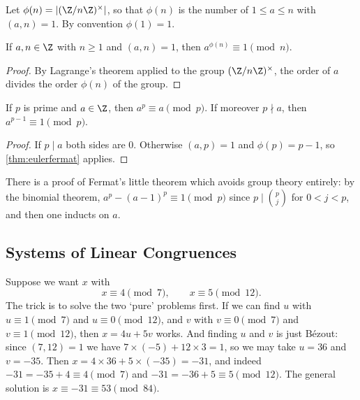 \begin{definition}
	Let $\phi(n) = |(\Z/n\Z)^\times|$, so that $\phi(n)$ is the number of $1 \leq a \leq n$ with $(a, n) = 1$. By convention $\phi(1) = 1$.
\end{definition}

\begin{theorem}\label{thm:eulerfermat}
	If $a, n \in \Z$ with $n \geq 1$ and $(a, n) = 1$, then $a^{\phi(n)} \equiv 1 \pmod n$.
\end{theorem}
\begin{proof}
	By Lagrange's theorem applied to the group $(\Z/n\Z)^\times$, the order of $a$ divides the order $\phi(n)$ of the group.
\end{proof}

\begin{theorem}\label{thm:flt}
	If $p$ is prime and $a \in \Z$, then $a^p \equiv a \pmod p$. If moreover $p \nmid a$, then $a^{p-1} \equiv 1 \pmod p$.
\end{theorem}
\begin{proof}
	If $p \mid a$ both sides are $0$. Otherwise $(a, p) = 1$ and $\phi(p) = p - 1$, so \autoref{thm:eulerfermat} applies.
\end{proof}

\begin{remark}
	There is a proof of Fermat's little theorem which avoids group theory entirely: by the binomial theorem, $a^p - (a-1)^p \equiv 1 \pmod p$ since $p \mid \binom{p}{j}$ for $0 < j < p$, and then one inducts on $a$.
\end{remark}

\subsection{Systems of Linear Congruences}

Suppose we want $x$ with
$$
x \equiv 4 \pmod 7, \qquad x \equiv 5 \pmod{12}.
$$
The trick is to solve the two `pure' problems first. If we can find $u$ with $u \equiv 1 \pmod 7$ and $u \equiv 0 \pmod{12}$, and $v$ with $v \equiv 0 \pmod 7$ and $v \equiv 1 \pmod{12}$, then $x = 4u + 5v$ works. And finding $u$ and $v$ is just Bézout: since $(7, 12) = 1$ we have $7 \times (-5) + 12 \times 3 = 1$, so we may take $u = 36$ and $v = -35$. Then $x = 4 \times 36 + 5 \times (-35) = -31$, and indeed $-31 = -35 + 4 \equiv 4 \pmod 7$ and $-31 = -36 + 5 \equiv 5 \pmod{12}$. The general solution is $x \equiv -31 \equiv 53 \pmod{84}$.

